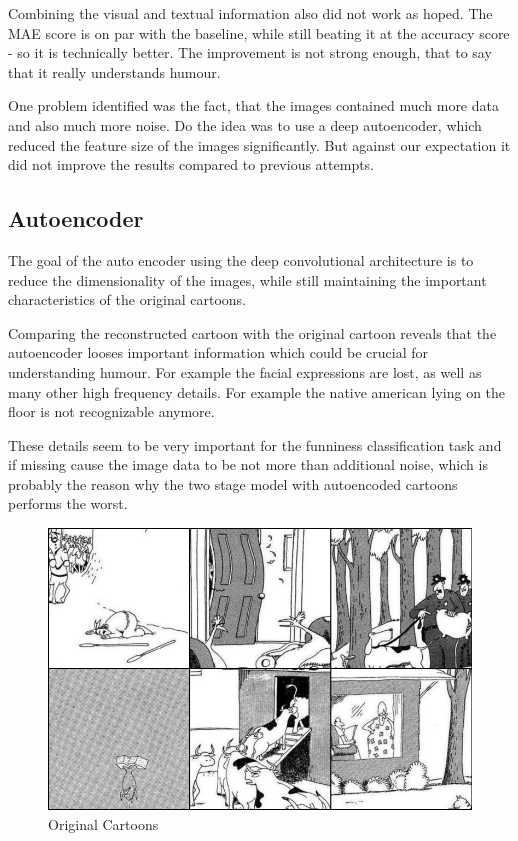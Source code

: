 \documentclass[draft,final,oneside]{vutinfth} %
\begin{document}
Combining the visual and textual information also did not work as hoped. The MAE
score is on par with the baseline, while still beating it at the accuracy score - so it is
technically better. The improvement is not strong enough, that to say that it really
understands humour.

One problem identified was the fact, that the images contained much more data and
also much more noise. Do the idea was to use a deep autoencoder, which reduced the
feature size of the images significantly. But against our expectation it did not improve
the results compared to previous attempts.

\subsection{Autoencoder}

The goal of the auto encoder using the deep convolutional architecture is to reduce the dimensionality of the images, while still maintaining the important characteristics of the original cartoons. 

Comparing the reconstructed cartoon with the original cartoon reveals that the autoencoder looses important information which could be crucial for understanding humour. For example the facial expressions are lost, as well as many other high frequency details. For example the native american lying on the floor is not recognizable anymore. 

These details seem to be very important for the funniness classification task and if missing cause the image data to be not more than additional noise, which is probably the reason why the two stage model with autoencoded cartoons performs the worst.

\begin{figure}[ht]
	\centering
  	\includegraphics[width=1.0\textwidth]{graphics/autoencoder_original.png}
	\caption{Original Cartoons}
	\label{fig:autoencoderimageoriginal}
\end{figure}
\end{document}
